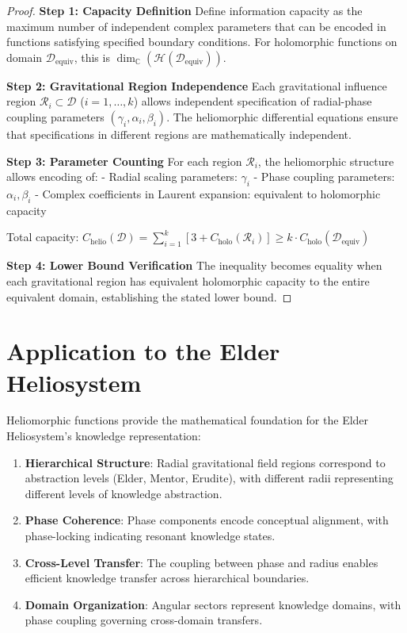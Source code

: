 \begin{proof}
\textbf{Step 1: Capacity Definition}
Define information capacity as the maximum number of independent complex parameters that can be encoded in functions satisfying specified boundary conditions. For holomorphic functions on domain $\mathcal{D}_{\text{equiv}}$, this is $\dim_{\mathbb{C}}(\mathcal{H}(\mathcal{D}_{\text{equiv}}))$.

\textbf{Step 2: Gravitational Region Independence}
Each gravitational influence region $\mathcal{R}_i \subset \mathcal{D}$ ($i = 1, \ldots, k$) allows independent specification of radial-phase coupling parameters $(\gamma_i, \alpha_i, \beta_i)$. The heliomorphic differential equations ensure that specifications in different regions are mathematically independent.

\textbf{Step 3: Parameter Counting}
For each region $\mathcal{R}_i$, the heliomorphic structure allows encoding of:
- Radial scaling parameters: $\gamma_i$
- Phase coupling parameters: $\alpha_i, \beta_i$ 
- Complex coefficients in Laurent expansion: equivalent to holomorphic capacity

Total capacity: $C_{\text{helio}}(\mathcal{D}) = \sum_{i=1}^k [3 + C_{\text{holo}}(\mathcal{R}_i)] \geq k \cdot C_{\text{holo}}(\mathcal{D}_{\text{equiv}})$

\textbf{Step 4: Lower Bound Verification}
The inequality becomes equality when each gravitational region has equivalent holomorphic capacity to the entire equivalent domain, establishing the stated lower bound.
\end{proof}

\section{Application to the Elder Heliosystem}

Heliomorphic functions provide the mathematical foundation for the Elder Heliosystem's knowledge representation:

\begin{enumerate}
    \item \textbf{Hierarchical Structure}: Radial gravitational field regions correspond to abstraction levels (Elder, Mentor, Erudite), with different radii representing different levels of knowledge abstraction.
    
    \item \textbf{Phase Coherence}: Phase components encode conceptual alignment, with phase-locking indicating resonant knowledge states.
    
    \item \textbf{Cross-Level Transfer}: The coupling between phase and radius enables efficient knowledge transfer across hierarchical boundaries.
    
    \item \textbf{Domain Organization}: Angular sectors represent knowledge domains, with phase coupling governing cross-domain transfers.
\end{enumerate}


